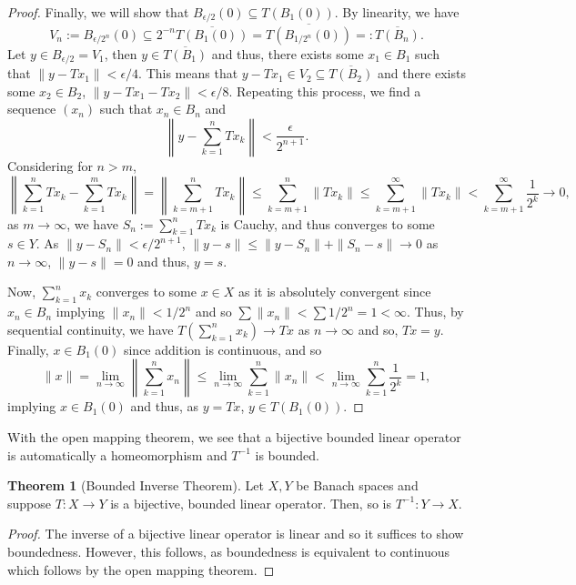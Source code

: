 \documentclass[]{article}
\theoremstyle{definition}
\newtheorem{theorem}{Theorem}
\theoremstyle{definition}
\begin{document}
\begin{proof}
  Finally, we will show that \(B_{\epsilon / 2}(0) \subseteq T(B_1(0))\). 
  By linearity, we have 
  \[V_n := B_{\epsilon / 2^n}(0) \subseteq 2^{-n} \overline{T(B_1(0))} = 
  \overline{T(B_{1 / 2^n}(0))} =: \overline{T(B_n)}.\]
  Let \(y \in B_{\epsilon / 2} = V_1\), then \(y \in \overline{T(B_1)}\) 
  and thus, there exists some \(x_1 \in B_1\) such that \(\|y - Tx_1\| < \epsilon / 4\).
  This means that \(y - Tx_1 \in V_2 \subseteq \overline{T(B_2)}\) and there 
  exists some \(x_2 \in B_2\), \(\|y - Tx_1 - Tx_2\| < \epsilon / 8\). 
  Repeating this process, we find a sequence \((x_n)\) such that \(x_n \in B_n\) 
  and 
  \[\left\| y - \sum_{k = 1}^n Tx_k \right\| < \frac{\epsilon}{2^{n + 1}}.\]
  Considering for \(n > m\), 
  \[\left\|\sum_{k = 1}^n Tx_k - \sum_{k = 1}^m Tx_k\right\| = 
    \left\|\sum_{k = m + 1}^n Tx_k\right\| \le 
    \sum_{k = m + 1}^n \| Tx_k\| \le \sum_{k = m + 1}^\infty \|T x_k\| < 
    \sum_{k = m + 1}^\infty \frac{1}{2^k} \to 0,\]
  as \(m \to \infty\), we have \(S_n := \sum_{k = 1}^n T x_k\) is Cauchy, and 
  thus converges to some \(s \in Y\). As \(\|y - S_n\| < \epsilon / 2^{n + 1}\), 
  \(\|y - s\| \le \|y - S_n\| + \|S_n - s\| \to 0\) as \(n \to \infty\), 
  \(\|y - s\| = 0\) and thus, \(y = s\).
  
  Now, \(\sum_{k = 1}^n x_k\) converges to some \(x \in X\) as it is 
  absolutely convergent since \(x_n \in B_n\) implying \(\|x_n\| < 1 / 2^n\) 
  and so \(\sum \|x_n\| < \sum 1 / 2^n = 1 < \infty\). Thus, by sequential 
  continuity, we have 
  \(T(\sum_{k = 1}^n x_k) \to T x\) as \(n \to \infty\) and so, \(Tx = y\).
  Finally, \(x \in B_1(0)\) since addition is continuous, and so 
  \[\|x\| = \lim_{n \to \infty} \left\| \sum_{k = 1}^n x_n \right\|
    \le \lim_{n \to \infty} \sum_{k = 1}^n \|x_n\| < 
    \lim_{n \to \infty} \sum_{k = 1}^n \frac{1}{2^k} = 1,\]
  implying \(x \in B_1(0)\) and thus, as \(y = Tx\), \(y \in T(B_1(0))\).
\end{proof}

With the open mapping theorem, we see that a bijective bounded linear operator 
is automatically a homeomorphism and \(T^{-1}\) is bounded.

\begin{theorem}[Bounded Inverse Theorem]
  Let \(X, Y\) be Banach spaces and suppose \(T : X \to Y\) is a bijective, 
  bounded linear operator. Then, so is \(T^{-1} : Y \to X\).
\end{theorem}
\begin{proof}
  The inverse of a bijective linear operator is linear and so it suffices to 
  show boundedness. However, this follows, as boundedness is equivalent to 
  continuous which follows by the open mapping theorem.
\end{proof}
\end{document}
